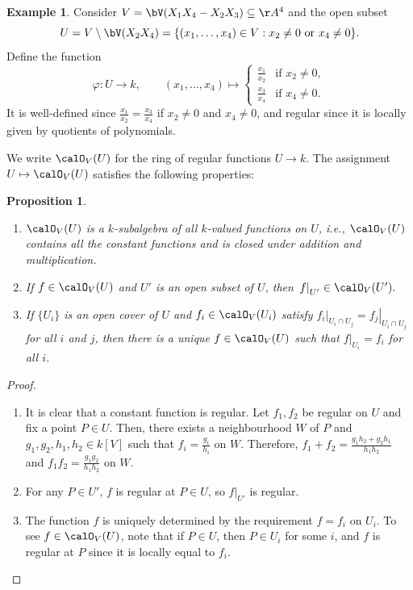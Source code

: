 \documentclass[12pt]{amsart}
\theoremstyle{plain}
\newtheorem{proposition}[theorem]{Proposition}
\theoremstyle{definition}
\newtheorem{example}[theorem]{Example}
\begin{document}
\begin{example}
Consider $V = \bV(X_1 X_4 - X_2 X_3) \subseteq \AA^4$ and the open subset
$$U = V \setminus \bV(X_2 X_4) = \{(x_1, \ldots, x_4) \in V : x_2 \ne 0 \text{ or } x_4 \ne 0\}.$$
Define the function
$$\varphi : U \to k, \qquad
(x_1, \ldots, x_4) \mapsto 
\begin{cases} 
	\frac{x_1}{x_2} & \text{if } x_2 \ne 0, \\ 
	\frac{x_3}{x_4} & \text{if } x_4 \ne 0. 
\end{cases}$$
It is well-defined since $\frac{x_1}{x_2} = \frac{x_3}{x_4}$ if $x_2 \ne 0$ and $x_4 \ne 0$, and regular since it is locally given by quotients of polynomials.
\end{example}

We write $\calO_V(U)$ for the ring of regular functions $U \to k$.
The assignment $U \mapsto \calO_V(U)$ satisfies the following properties:

\begin{proposition}\label{sheafprop}
\begin{enumerate}
\item
$\calO_V(U)$ is a $k$-subalgebra of all $k$-valued functions on $U$, i.e., $\calO_V(U)$ contains all the constant functions and is closed under addition and multiplication.

\item
If $f \in \calO_V(U)$ and $U'$ is an open subset of $U$, then $\left. f \right|_{U'} \in \calO_V(U').$

\item
If $\{U_i\}$ is an open cover of $U$ and $f_i \in \calO_V(U_i)$ satisfy $\left. f_i \right|_{U_i \cap U_j} = \left. f_j \right|_{U_i \cap U_j}$ for all $i$ and $j$, then there is a unique $f \in \calO_V(U)$ such that $\left. f \right|_{U_i} = f_i$ for all $i$.
\end{enumerate}
\end{proposition}
\begin{proof}
\begin{enumerate}
\item
It is clear that a constant function is regular.
Let $f_1, f_2$ be regular on $U$ and fix a point $P \in U$.
Then, there exists a neighbourhood $W$ of $P$ and $g_1, g_2, h_1, h_2 \in k[V]$ such that $f_i = \frac{g_i}{h_i}$ on $W$.
Therefore, $f_1 + f_2 = \frac{g_1 h_2 + g_2 h_1}{h_1 h_2}$ and $f_1 f_2 = \frac{g_1 g_2}{h_1 h_2}$ on $W$.

\item
For any $P \in U'$, $f$ is regular at $P \in U$, so $\left. f \right|_{U'}$ is regular.

\item
The function $f$ is uniquely determined by the requirement $f = f_i$ on $U_i$.
To see $f \in \calO_V(U)$, note that if $P \in U$, then $P\in U_i$ for some $i$, and $f$ is regular at $P$ since it is locally equal to $f_i$.
\end{enumerate}
\end{proof}
\end{document}
